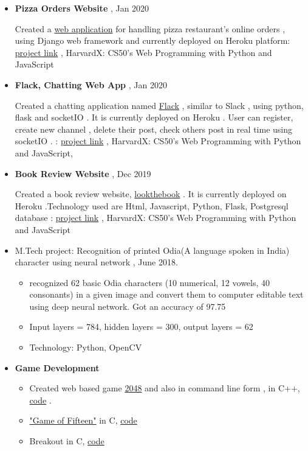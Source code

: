 \documentclass[a4paper,10pt]{article}
\begin{document}
	\begin{itemize}
	\item \textbf{Pizza Orders Website} , Jan 2020
	
	 Created a \href{https://pizzacs50w.herokuapp.com/}{web application} for handling pizza restaurant's online orders , using Django web framework and currently deployed on Heroku platform: \href{https://github.com/eelectron/pizza}{project link} , HarvardX: CS50's Web Programming with Python and JavaScript
					
				\item \textbf{Flack, Chatting Web App} , Jan 2020 
				
				Created a chatting application named \href{https://flackthechat.herokuapp.com}{Flack} , similar to Slack , using python, flask and socketIO . It is currently deployed on Heroku . User can register, create new channel , delete their post, check others post in real time using socketIO . : \href{https://github.com/eelectron/flack}{project link} , HarvardX: CS50's Web Programming with Python and JavaScript, 
				
				\item \textbf{Book Review Website} , Dec 2019
				
				Created a book review website, \href{http://lookthebook.herokuapp.com}{lookthebook} . It is currently deployed on Heroku .Technology used are Html, Javascript, Python, Flask, Postgresql database : \href{https://github.com/eelectron/BookReview}{project link}  , HarvardX: CS50's Web Programming with Python and JavaScript 
				
				
				\item M.Tech project: Recognition of printed Odia(A language spoken in India) character using neural network , June 2018.
				\begin{itemize}
				    \item recognized 62 basic Odia characters (10 numerical, 12 vowels, 40 consonants) in a given image and convert them to computer editable text using deep neural network. Got an accuracy of 97.75
				    \item Input layers = 784, hidden layers = 300, output layers = 62
				    \item Technology: Python, OpenCV
				\end{itemize}
					
                			
				\item \textbf{Game Development} 
				    \begin{itemize}
				    \item 
				    Created web based game \href{https://gitlab.com/psonlinux/2048-game-web}{2048} and also in command line form , in C++, \href{https://gitlab.com/psonlinux/2048}{code} .
				        \item \href{https://en.wikipedia.org/wiki/15_puzzle}{"Game of Fifteen"} in C, \href{https://gitlab.com/psonlinux/game-of-fifteen}{code}
\item Breakout in C, \href{https://gitlab.com/psonlinux/breakout}{code}				    
				    \end{itemize}
			\end{itemize}
			
\end{document}
